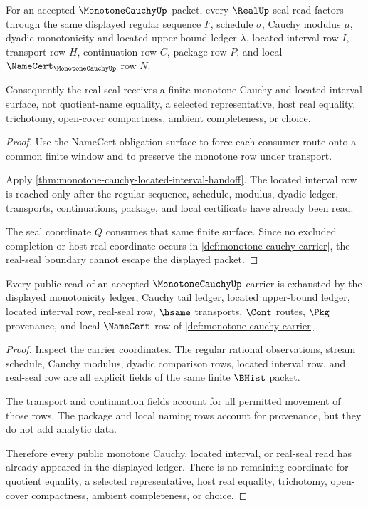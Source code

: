 \begin{theorem}
\label{thm:monotone-cauchy-real-seal-boundary}
For an accepted $\MonotoneCauchyUp$ packet, every $\RealUp$ seal read factors through the same displayed regular sequence $F$, schedule $\sigma$, Cauchy modulus $\mu$, dyadic monotonicity and located upper-bound ledger $\lambda$, located interval row $I$, transport row $H$, continuation row $C$, package row $P$, and local $\NameCert_{\MonotoneCauchyUp}$ row $N$.

Consequently the real seal receives a finite monotone Cauchy and located-interval surface, not quotient-name equality, a selected representative, host real equality, trichotomy, open-cover compactness, ambient completeness, or choice.
\end{theorem}
\begin{proof}
Use the NameCert obligation surface to force each consumer route onto a common finite window and to preserve the monotone row under transport.

Apply \autoref{thm:monotone-cauchy-located-interval-handoff}. The located interval row is reached only after the regular sequence, schedule, modulus, dyadic ledger, transports, continuations, package, and local certificate have already been read.

The seal coordinate $Q$ consumes that same finite surface. Since no excluded completion or host-real coordinate occurs in \autoref{def:monotone-cauchy-carrier}, the real-seal boundary cannot escape the displayed packet.
\end{proof}

\begin{theorem}
\label{thm:monotone-cauchy-ledger-exhaustion}
Every public read of an accepted $\MonotoneCauchyUp$ carrier is exhausted by the displayed monotonicity ledger, Cauchy tail ledger, located upper-bound ledger, located interval row, real-seal row, $\hsame$ transports, $\Cont$ routes, $\Pkg$ provenance, and local $\NameCert$ row of \autoref{def:monotone-cauchy-carrier}.
\end{theorem}
\begin{proof}
Inspect the carrier coordinates. The regular rational observations, stream schedule, Cauchy modulus, dyadic comparison rows, located interval row, and real-seal row are all explicit fields of the same finite $\BHist$ packet.

The transport and continuation fields account for all permitted movement of those rows. The package and local naming rows account for provenance, but they do not add analytic data.

Therefore every public monotone Cauchy, located interval, or real-seal read has already appeared in the displayed ledger. There is no remaining coordinate for quotient equality, a selected representative, host real equality, trichotomy, open-cover compactness, ambient completeness, or choice.
\end{proof}

